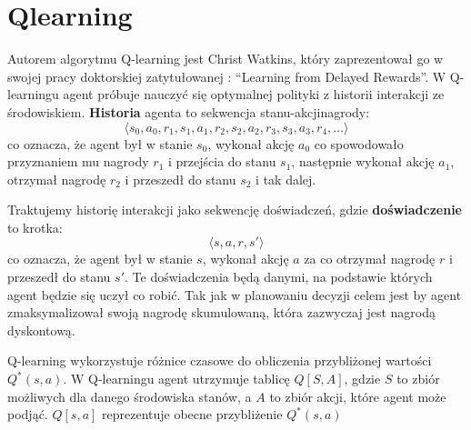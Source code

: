 \documentclass[a4paper, 12pt,oneside]{book}
\begin{document}
\section{Q\dywiz learning}
Autorem algorytmu Q-learning jest Christ Watkins, który zaprezentował go w
swojej pracy doktorskiej zatytułowanej : ``Learning from Delayed
Rewards''\cite{qlearning_inventor}.
W Q-learningu agent próbuje nauczyć się optymalnej polityki z historii
interakcji ze środowiskiem. \textbf{Historia} agenta to sekwencja
stanu-akcji\dywiz nagrody:
\[\langle s_0, a_0, r_1, s_1, a_1, r_2, s_2, a_2, r_3, s_3, a_3, r_4, \dots
\rangle\]
co oznacza, że agent był w stanie $s_0$, wykonał akcję $a_0$ co spowodowało
przyznaniem mu nagrody $r_1$ i przejścia do stanu $s_1$, następnie wykonał
akcję $a_1$, otrzymał nagrodę $r_2$ i przeszedł do stanu $s_2$ i tak dalej.

Traktujemy historię interakcji jako sekwencję doświadczeń, gdzie
\textbf{doświadczenie} to krotka:
\[\langle s, a, r, s' \rangle\]
co oznacza, że agent był w stanie $s$, wykonał akcję $a$ za co otrzymał nagrodę
$r$ i przeszedł do stanu $s'$. Te doświadczenia będą danymi, na podstawie
których agent będzie się uczył co robić. Tak jak w planowaniu decyzji celem
jest by agent zmaksymalizował swoją nagrodę skumulowaną, która zazwyczaj jest
nagrodą dyskontową.

Q-learning wykorzystuje różnice czasowe do obliczenia przybliżonej wartości
$Q^*(s, a)$. W Q-learningu agent utrzymuje tablicę $Q[S,A]$, gdzie $S$ to zbiór
możliwych dla danego środowiska stanów, a $A$ to zbiór akcji, które agent może
podjąć. $Q[s,a]$ reprezentuje obecne przybliżenie $Q^*(s,a)$
\end{document}
